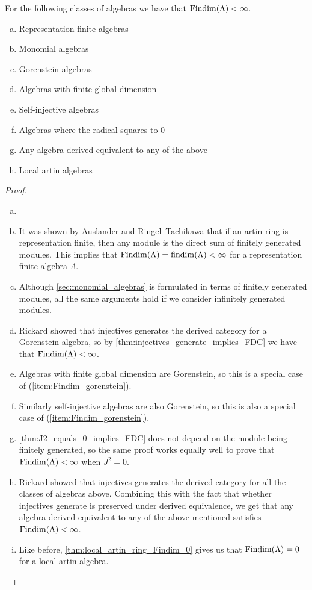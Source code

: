 \begin{theorem}
	For the following classes of algebras we have that $\operatorname{Findim}(\Lambda) < \infty$.
	\begin{enumerate}[a)]
		\item Representation-finite algebras
		\item Monomial algebras
		\item Gorenstein algebras
		\item Algebras with finite global dimension
		\item Self-injective algebras
		\item Algebras where the radical squares to 0
		\item Any algebra derived equivalent to any of the above
		\item Local artin algebras
	\end{enumerate}
	\begin{proof}
		\begin{enumerate}[(a)]
			\item[]
			\item It was shown by Auslander and Ringel--Tachikawa that if an artin ring is representation finite, then any module is the direct sum of finitely generated modules\cite{Aus74, RT74}. This implies that $\operatorname{Findim}(\Lambda) = \operatorname{findim}(\Lambda) < \infty$ for a representation finite algebra $\Lambda$.
			\item Although \cref{sec:monomial_algebras} is formulated in terms of finitely generated modules, all the same arguments hold if we consider infinitely generated modules. 
			\item \label{item:Findim_gorenstein} Rickard showed that injectives generates the derived category for a Gorenstein algebra\cite{Rick19}, so by \cref{thm:injectives_generate_implies_FDC} we have that $\operatorname{Findim}(\Lambda) < \infty$. 
			\item Algebras with finite global dimension are Gorenstein, so this is a special case of (\ref{item:Findim_gorenstein}).
			\item Similarly self-injective algebras are also Gorenstein, so this is also a special case of (\ref{item:Findim_gorenstein}).
			\item \cref{thm:J2_equals_0_implies_FDC} does not depend on the module being finitely generated, so the same proof works equally well to prove that $\operatorname{Findim}(\Lambda) < \infty$ when $J^2 = 0$.
			\item Rickard showed that injectives generates the derived category for all the classes of algebras above\cite[Corrolary~7.(4-6)]{Rick19}. Combining this with the fact that whether injectives generate is preserved under derived equivalence\cite[Theorem3.4]{Rick19}, we get that any algebra derived equivalent to any of the above mentioned satisfies $\operatorname{Findim}(\Lambda) < \infty$.
			\item Like before, \cref{thm:local_artin_ring_Findim_0} gives us that $\operatorname{Findim}(\Lambda)=0$ for a local artin algebra.
		\end{enumerate}
	\end{proof}
\end{theorem}

